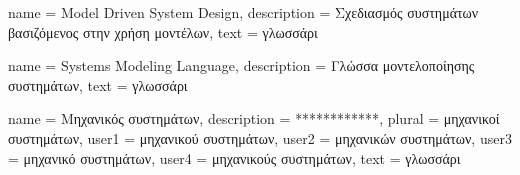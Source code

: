 ﻿%

	{name			= {Model Driven System Design},
	 description	= {Σχεδιασμός συστημάτων βασιζόμενος στην χρήση μοντέλων},
	 text			= {γλωσσάρι}
	}
	
	{name			= {Systems Modeling Language},
	 description	= {Γλώσσα μοντελοποίησης συστημάτων},
	 text			= {γλωσσάρι}
	}
	
	{name			= {Μηχανικός συστημάτων},
	 description	= {************},
	 plural			= {μηχανικοί συστημάτων},
	 user1			= {μηχανικού συστημάτων},
	 user2			= {μηχανικών συστημάτων},
	 user3			= {μηχανικό συστημάτων},
	 user4			= {μηχανικούς συστημάτων},
	 text			= {γλωσσάρι}
	}